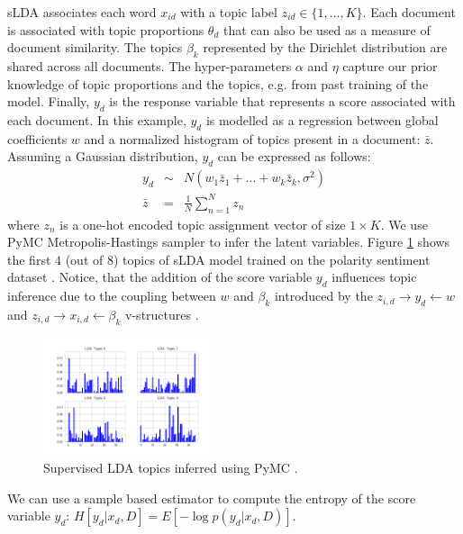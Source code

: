 sLDA associates each word $x_{id}$ with a topic label $z_{id}\in \{1,...,K\}$. Each document is associated with topic proportions $\theta_d$ that can also be used as a measure of document similarity. The topics $\beta_k$ represented by the Dirichlet distribution are shared across all documents. The hyper-parameters $\alpha$ and $\eta$ capture our prior knowledge of topic proportions and the topics, e.g. from past training of the model. Finally, $y_d$ is the response variable that represents a score associated with each document. In this example, $y_d$ is modelled as a regression between global coefficients $w$ and a normalized histogram of topics present in a document: $\bar{z}$. Assuming a Gaussian distribution, $y_d$ can be expressed as follows:
\begin{eqnarray}
   y_d &\sim& N(w_1\bar{z}_1 + ... + w_k\bar{z}_k, \sigma^2) \\
   \bar{z} &=& \frac{1}{N}\sum_{n=1}^{N}z_n
\end{eqnarray}
where $z_n$ is a one-hot encoded topic assignment vector of size $1\times K$. We use PyMC \cite{PyMC2010} Metropolis-Hastings sampler to infer the latent variables. Figure \ref{fig:slda_topics} shows the first $4$ (out of $8$) topics of sLDA model trained on the polarity sentiment dataset \cite{PolarityDataset}. Notice, that the addition of the score variable $y_d$ influences topic inference due to the coupling between $w$ and $\beta_k$ introduced by the $z_{i,d}\rightarrow y_d \leftarrow w$ and $z_{i,d}\rightarrow x_{i,d} \leftarrow \beta_k$ v-structures \cite{KollerBook}. 
\begin{figure}[h]
    \centering
    \includegraphics[width=0.45\textwidth]{figures/slda_topics.png}
    \caption{Supervised LDA topics inferred using PyMC \cite{PyMC2010}.}
    \label{fig:slda_topics}
\end{figure}

We can use a sample based estimator to compute the entropy of the score variable $y_d$: $H[y_d|x_d, D] = E[-\log p(y_d|x_d, D)]$.

